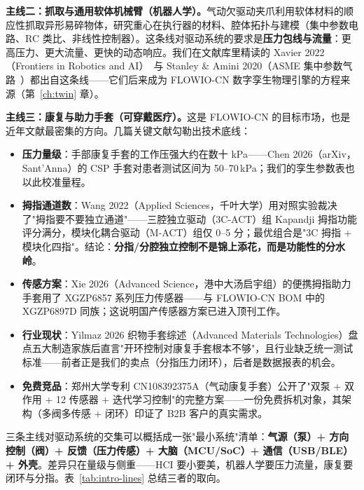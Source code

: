\textbf{主线二：抓取与通用软体机械臂（机器人学）。}气动欠驱动夹爪利用软体材料的顺应性抓取异形易碎物体，研究重心在执行器的材料、腔体拓扑与建模（集中参数电路、RC 类比、非线性控制器）。这条线对驱动系统的要求是\textbf{压力包线与流量}：更高压力、更大流量、更快的动态响应。我们在文献库里精读的 Xavier 2022（Frontiers in Robotics and AI）~\cite{Xavier2022Frontiers}与 Stanley \& Amini 2020（ASME 集中参数气路~\cite{Stanley2021}）都出自这条线——它们后来成为 FLOWIO-CN 数字孪生物理引擎的方程来源（第~\ref{ch:twin} 章）。

\textbf{主线三：康复与助力手套（可穿戴医疗）。}这是 FLOWIO-CN 的目标市场，也是近年文献最密集的方向。几篇关键文献勾勒出技术底线：

\begin{itemize}
  \item \textbf{压力量级}：手部康复手套的工作压强大约在数十 kPa——Chen 2026（arXiv，Sant'Anna）的 CSP 手套对患者测试区间为 50--70\,kPa；我们的孪生参数表也以此校准量程。
  \item \textbf{拇指通道数}：Wang 2022（Applied Sciences，千叶大学）用对照实验裁决了"拇指要不要独立通道"——三腔独立驱动（3C-ACT）组 Kapandji 拇指功能评分满分，模块化耦合驱动（M-ACT）组仅 0--5 分；最优组合是"3C 拇指 + 模块化四指"。结论：\textbf{分指/分腔独立控制不是锦上添花，而是功能性的分水岭}。
  \item \textbf{传感方案}：Xie 2026（Advanced Science，港中大汤启宇组）的便携拇指助力手套用了 XGZP6857 系列压力传感器——与 FLOWIO-CN BOM 中的 XGZP6897D 同族；这说明国产传感器方案已进入顶刊工作。
  \item \textbf{行业现状}：Yilmaz 2026 织物手套综述（Advanced Materials Technologies）盘点五大制造家族后直言"开环控制对康复手套根本不够"，且行业缺乏统一测试标准——前者正是我们的卖点（分指压力闭环），后者是数据报表的机会。
  \item \textbf{免费竞品}：郑州大学专利 CN108392375A（气动康复手套）公开了"双泵 + 双作用 + 12 传感器 + 迭代学习控制"的完整方案——一份免费拆机对象，其架构（多阀多传感 + 闭环）印证了 B2B 客户的真实需求。
\end{itemize}

三条主线对驱动系统的交集可以概括成一张"最小系统"清单：\textbf{气源（泵）+ 方向控制（阀）+ 反馈（压力传感）+ 大脑（MCU/SoC）+ 通信（USB/BLE）+ 外壳}。差异只在量级与侧重——HCI 要小要美，机器人学要压力流量，康复要闭环与分指。表~\ref{tab:intro-lines} 总结三者的取向。

